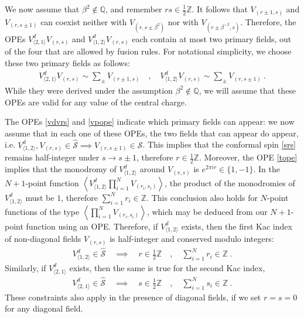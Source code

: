 \documentclass[12pt, a4paper]{article}
\theoremstyle{break}
\begin{document}
We now assume that $\beta^2\notin \mathbb{Q}$, and remember $rs\in\frac12\mathbb{Z}$. It follows that $V_{(r\pm 1,s)}$ and $V_{(r,s\pm 1)}$ can coexist neither with $V_{(r,s\pm \beta^2)}$ nor with $V_{(r\pm \beta^{-2},s)}$. Therefore, the OPEs $V^d_{\langle 2,1\rangle}V_{(r,s)}$ and $V^d_{\langle 1,2\rangle}V_{(r,s)}$ each contain at most two primary fields, out of the four that are allowed by fusion rules. For notational simplicity, we choose these two primary fields as follows: 
\begin{align}
 \boxed{V^d_{\langle 2,1\rangle}V_{(r,s)} \sim \sum_\pm V_{(r\pm 1,s)}} \quad ,\quad
 \boxed{V^d_{\langle 1,2\rangle}V_{(r,s)} \sim \sum_\pm V_{(r,s\pm 1)}}\ . 
 \label{vdvrs}
\end{align}
While they were derived under the assumption $\beta^2\notin \mathbb{Q}$, we will assume that these OPEs are valid for any value of the central charge. 

The OPEs \eqref{vdvrs} and \eqref{vpope} indicate which primary fields can appear: we now assume that in each one of these OPEs, the two fields that can appear do appear, i.e.  $V^d_{\langle 1,2\rangle},V_{(r,s)}\in\widehat{\mathcal{S}}\implies V_{(r,s\pm 1)}\in\widehat{\mathcal{S}}$. 
This implies that the conformal spin \eqref{srs} remains half-integer under $s\to s\pm 1$, therefore
$r\in \frac12 \mathbb{Z}$. Moreover, the OPE \eqref{tope} implies that the monodromy of $V^d_{\langle 1,2\rangle}$ around $V_{(r,s)}$ is $e^{2\pi ir}\in \{1,-1\}$.
In the $N+1$-point function $\left<V^d_{\langle 1,2\rangle}\prod_{i=1}^NV_{(r_i,s_i)}\right>$,
the product of the monodromies of $V^d_{\langle 1,2\rangle}$ must be $1$, therefore $\sum_{i=1}^N r_i  \in \mathbb{Z}$. This conclusion also holds for $N$-point functions of the type $\left<\prod_{i=1}^NV_{(r_i,s_i)}\right>$, which may be deduced from our $N+1$-point function using an OPE. Therefore, if $V^d_{\langle 1,2\rangle}$ exists, then the first Kac index of non-diagonal fields $V_{(r,s)}$ is half-integer and conserved modulo integers:
\begin{align}
 \boxed{V^d_{\langle 1,2\rangle}\in\widehat{\mathcal{S}} \quad \implies\quad  r\in \frac12\mathbb{Z} \quad , \quad \sum_{i=1}^N r_i  \in \mathbb{Z}}\ . 
 \label{sriz}
\end{align}
Similarly, if $V^d_{\langle 2,1\rangle}$ exists, then the same is true for the second Kac index,
\begin{align}
 \boxed{V^d_{\langle 2,1\rangle}\in\widehat{\mathcal{S}} \quad \implies\quad  s\in \frac12\mathbb{Z} \quad , \quad \sum_{i=1}^N s_i  \in \mathbb{Z}}\ . 
 \label{ssiz}
\end{align}
These constraints also apply in the presence of diagonal fields, if we set $r=s=0$ for any diagonal field. 
\end{document}
